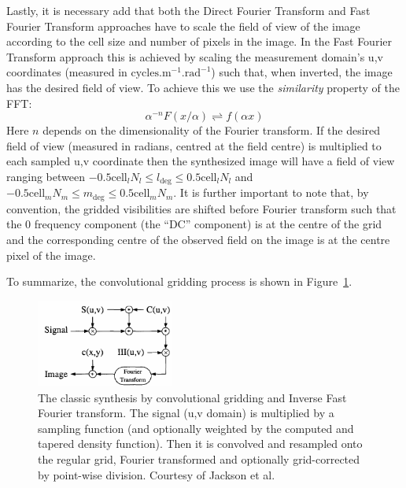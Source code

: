  Lastly, it is necessary add that both the Direct Fourier Transform and Fast Fourier Transform approaches
 have to scale the field of view of the image according to the cell size and number of pixels in the image. In the Fast Fourier Transform approach this is 
 achieved by scaling the measurement domain's u,v coordinates (measured in $\text{cycles}.\text{m}^{-1}.\text{rad}^{-1}$) such that, when inverted, the image
 has the desired field of view. To achieve this we use the \emph{similarity} property of the FFT:
 \begin{equation}
  \alpha^{-n}F(x/\alpha) \rightleftharpoons f(\alpha x)
 \end{equation}
 Here $n$ depends on the dimensionality of the Fourier transform. If the desired field of view (measured in radians, centred at the field centre) is multiplied to 
 each sampled u,v coordinate then the synthesized image will have a field of view ranging between $-0.5\text{cell}_{l}N_l\leq l_{\text{deg}}\leq0.5\text{cell}_{l}N_l$ and 
 $-0.5\text{cell}_{m}N_m\leq m_{\text{deg}}\leq0.5\text{cell}_{m}N_m$. It is further important to note that, by convention, the gridded visibilities are shifted before Fourier 
 transform such that the 0 frequency component (the ``DC'' component) is at the centre of the grid and the corresponding centre of the 
 observed field on the image is at the centre pixel of the image.
 
 To summarize, the convolutional gridding process is shown in Figure~\ref{fig_synth_pipeline}.
 \begin{figure}[h]
  \begin{mdframed}
    \centering
    \includegraphics[width=0.4\textwidth]{images/convolutional_gridding_flow.png}
    \caption[Synthesis using convolutional gridding]{The classic synthesis by convolutional gridding and Inverse Fast Fourier transform.
    The signal (u,v domain) is multiplied by a sampling function (and optionally weighted by the computed and tapered density function). Then it is convolved
    and resampled onto the regular grid, Fourier transformed and optionally grid-corrected by point-wise division. Courtesy of Jackson et al. \cite{jackson1991selection}}
    \label{fig_synth_pipeline}
  \end{mdframed}
 \end{figure}
 
